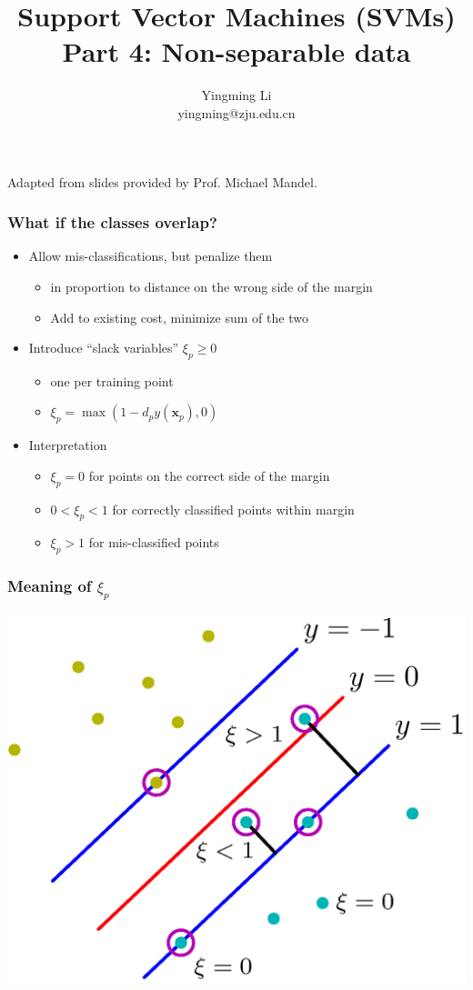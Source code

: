 \documentclass[12pt,notes,mathserif]{beamer}
\title{ Support Vector Machines (SVMs)\\Part 4: Non-separable data}
\author[YingmingLi]{Yingming Li \\ yingming@zju.edu.cn}
\institute[DSERC, ZJU]{Data Science \& Engineering Research Center, ZJU}
\begin{document}

\begin{frame}[c]
	\titlepage
	\begin{center}
		Adapted from slides provided by Prof. Michael Mandel.
	\end{center}
\end{frame}

\begin{frame}[c]
\frametitle{What if the classes overlap?}
\begin{itemize}
\item  Allow mis-classifications, but penalize them
\begin{itemize}
\item  in proportion to distance on the wrong side of the margin
\item  Add to existing cost, minimize sum of the two
\end{itemize}
\item Introduce ``slack variables'' $\xi_p\geqslant{}0$
\begin{itemize}
\item one per training point
\item $\xi_p=\max (1-d_py(\mathbf{x}_p),0)$
\end{itemize}
\item Interpretation
\begin{itemize}
\item $\xi_p=0$ for points on the correct side of the margin
\item $0<\xi_p < 1$ for correctly classified points within margin
\item $\xi_p>1$ for mis-classified points
\end{itemize}
\end{itemize}
\end{frame}


\begin{frame}[c]
\frametitle{Meaning of $\xi_p$}
\begin{center}
\includegraphics[width=0.7\linewidth]{fig10/lec113.jpg}
\end{center}
\end{frame}
\end{document}
